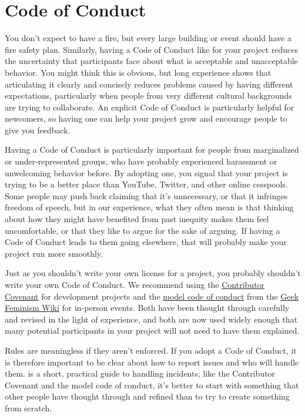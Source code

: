 \section{Code of Conduct}\label{s:collab-conduct}

You don't expect to have a fire,
but every large building or event should have a fire safety plan.
Similarly,
having a Code of Conduct like  for your project
reduces the uncertainty that participants face about what is acceptable and unacceptable behavior.
You might think this is obvious,
but long experience shows that articulating it clearly and concisely reduces problems caused by having different expectations,
particularly when people from very different cultural backgrounds are trying to collaborate.
An explicit Code of Conduct is particularly helpful for newcomers,
so having one can help your project grow
and encourage people to give you feedback.

Having a Code of Conduct is particularly important for people from marginalized or under-represented groups,
who have probably experienced harassment or unwelcoming behavior before.
By adopting one,
you signal that your project is trying to be a better place than YouTube,
Twitter,
and other online cesspools.
Some people may push back claiming that it's unnecessary,
or that it infringes freedom of speech,
but in our experience,
what they often mean is that thinking about how they might have benefited from past inequity makes them feel uncomfortable,
or that they like to argue for the sake of arguing.
If having a Code of Conduct leads to them going elsewhere,
that will probably make your project run more smoothly.

Just as you shouldn't write your own license for a project,
you probably shouldn't write your own Code of Conduct.
We recommend using the \href{https://www.contributor-covenant.org}{Contributor Covenant} for development projects
and the \href{http://geekfeminism.wikia.com/wiki/Conference_anti-harassment/Policy}{model code of conduct} from the \href{http://geekfeminism.wikia.com/}{Geek Feminism Wiki} for in-person events.
Both have been thought through carefully and revised in the light of experience,
and both are now used widely enough that
many potential participants in your project will not need to have them explained.

Rules are meaningless if they aren't enforced.
If you adopt a Code of Conduct,
it is therefore important to be clear about how to report issues and who will handle them.
\cite{Auro2018} is a short, practical guide to handling incidents;
like the Contributor Covenant and the model code of conduct,
it's better to start with something that other people have thought through and refined
than to try to create something from scratch.

